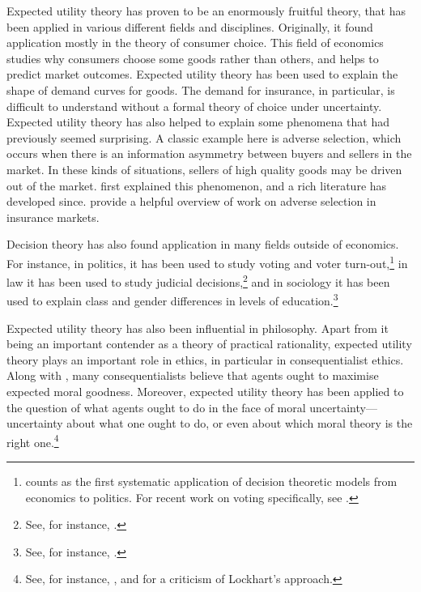 Expected utility theory has proven to be an enormously fruitful theory, that has been applied in various different fields and disciplines. Originally, it found application mostly in the theory of consumer choice. This field of economics studies why consumers choose some goods rather than others, and helps to predict market outcomes. Expected utility theory has been used to explain the shape of demand curves for goods. The demand for insurance, in particular, is difficult to understand without a formal theory of choice under uncertainty. Expected utility theory has also helped to explain some phenomena that had previously seemed surprising. A classic example here is adverse selection, which occurs when there is an information asymmetry between buyers and sellers in the market. In these kinds of situations, sellers of high quality goods may be driven out of the market. \citet{Akerlof1970} first explained this phenomenon, and a rich literature has developed since. \citet{EinavFinkelstein2011} provide a helpful overview of work on adverse selection in insurance markets.

Decision theory has also found application in many fields outside of economics. For instance, in politics, it has been used to study voting and voter turn-out,\footnote{\citet{Downs1957} counts as the first systematic application of decision theoretic models from economics to politics. For recent work on voting specifically, see \citet{Feddersen2004}.} in law it has been used to study judicial decisions,\footnote{See, for instance, \citet{EpsteinLandesPosner2013}.} and in sociology it has been used to explain class and gender differences in levels of education.\footnote{See, for instance, \citet{BreenGoldthorpe1997}.}

Expected utility theory has also been influential in philosophy. Apart from it being an important contender as a theory of practical rationality, expected utility theory plays an important role in ethics, in particular in consequentialist ethics. Along with \citet{Jackson1991}, many consequentialists believe that agents ought to maximise expected moral goodness. Moreover, expected utility theory has been applied to the question of what agents ought to do in the face of moral uncertainty---uncertainty about what one ought to do, or even about which moral theory is the right one.\footnote{See, for instance, \citet{Lockhart2000}, and \citet{Sepielli2013} for a criticism of Lockhart's approach.}

